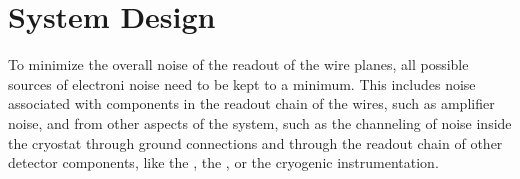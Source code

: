 \section{System Design}
\label{sec:fdsp-tpcelec-design}

\begin{comment}
In order to achieve the lowest possible overall noise in the readout of 
the \dword{apa} wire planes, all possible sources of noise need to be kept to a
minimum. This requires not only minimizing the noise sources in each
of the components of the readout chain of the \dword{apa} wires, like
the \dword{fe} amplifier noise. It also requires that all system aspects
are taken into account, including avoiding channeling noise inside
the cryostat through ground connections and through the readout
chain of other detector components, like the \dword{pds}, the \dword{hvs},
or the cryogenic instrumentation. In this Section we describe,the overall
system design of the \dword{ce}, starting in
\ref{sec:fdsp-tpcelec-design-grounding} with a description of the
grounding and shielding scheme adopted in the \dword{dune} \dword{spmod}
to minimize the overall noise in the detector, followed in
\ref{sec:fdsp-tpcelec-design-bias} by a discussion of the bias
voltage distribution system. Later, we describe in 
\ref{sec:fdsp-tpcelec-design-femb} the \dwords{femb}, including
the design of the \dwords{asic} that are being considered for
use in \dword{dune}. In~\ref{sec:fdsp-tpcelec-design-infrastructure}
we discuss the infrastructure for the \dword{ce} inside the cryostat,
that includes the cold boxes that shield the \dwords{femb}, the
cold cables, and the cables trays. Then in
\ref{sec:fdsp-tpcelec-design-ft}-\ref{sec:fdsp-tpcelec-design-timing} we discuss 
the infrastructure on the top of the cryostat, including the
feedthroughs, the \dwords{wiec}, the timing distribution and
synchronization system, and the services that provide the low
voltage power and the bias voltage to the \dword{ce}. Finally,
we conclude in~\ref{sec:fdsp-tpcelec-overview-remaining}
with a discussion of the design maturity and of
the remaining prototype activities that are required prior to
the beginning of he detector construction. Other aspects of
the system design, pertaining to the grounding of other 
detector components, are discussed in Section~\ref{sec:fdsp-tpcelec-interfaces}.
\end{comment}

To minimize the overall noise of the readout of the 
wire planes, all possible sources of electroni noise need to be kept to a
minimum.  This includes noise associated with components in the readout chain
of the  wires, such as  amplifier noise, and from other
aspects of the system, such as the channeling of noise inside the cryostat
through ground connections and through the readout chain of other detector
components, like the , the , or the cryogenic
instrumentation. 

